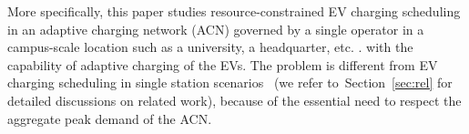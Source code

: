 

More specifically, this paper studies resource-constrained EV charging scheduling in an adaptive charging network (ACN) governed by a single operator in a campus-scale location such as a university, a headquarter, etc. \cite{wu2017two}. 
 with the capability of adaptive charging of the EVs. 
The problem is different from EV charging scheduling  in single station scenarios~\cite{Tang,Wen,Shroff2014,WTang,Chen,Xiang,Zhao,Robu} (we refer to~Section~\ref{sec:rel} for detailed discussions on related work), because of the essential need to respect the aggregate peak demand of the ACN. 




